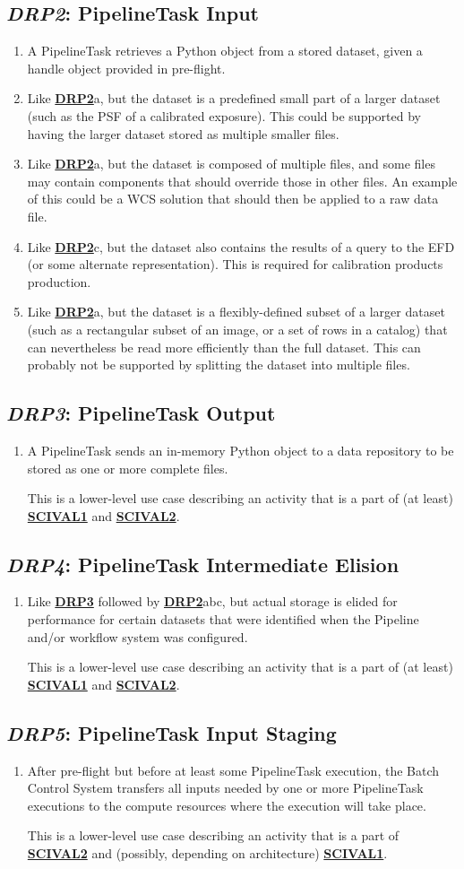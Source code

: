 \documentclass[DM,toc,lsstdraft]{lsstdoc}
\newcommand{\usecase}[3]{%
\subsection{\emph{#1}: #2}
\label{use:#1}
\begin{enumerate}[label=\alph*.]
#3
\end{enumerate}
}
\newcommand{\useref}[1]{\hyperref[use:#1]{\textcolor{lsstblue}{\textbf{#1}}}}
\begin{document}
\usecase{DRP2}{PipelineTask Input}{%

\item
A PipelineTask retrieves a Python object from a stored dataset, given a handle object provided in pre-flight.

\item
Like \useref{DRP2}a, but the dataset is a predefined small part of a larger dataset (such as the PSF of a calibrated exposure).
This could be supported by having the larger dataset stored as multiple smaller files.

\item
Like \useref{DRP2}a, but the dataset is composed of multiple files, and some files may contain components that should override those in other files.
An example of this could be a WCS solution that should then be applied to a raw data file.

\item
Like \useref{DRP2}c, but the dataset also contains the results of a query to the EFD (or some alternate representation).  This is required for calibration products production.

\item
Like \useref{DRP2}a, but the dataset is a flexibly-defined subset of a larger dataset (such as a rectangular subset of an image, or a set of rows in a catalog) that can nevertheless be read more efficiently than the full dataset.
This can probably not be supported by splitting the dataset into multiple files.
}

\usecase{DRP3}{PipelineTask Output}{%

\item
A PipelineTask sends an in-memory Python object to a data repository to be stored as one or more complete files.

This is a lower-level use case describing an activity that is a part of (at least) \useref{SCIVAL1} and \useref{SCIVAL2}.
}

\usecase{DRP4}{PipelineTask Intermediate Elision}{%

\item
Like \useref{DRP3} followed by \useref{DRP2}abc, but actual storage is elided for performance for certain datasets that were identified when the Pipeline and/or workflow system was configured.

This is a lower-level use case describing an activity that is a part of (at least) \useref{SCIVAL1} and \useref{SCIVAL2}.
}

\usecase{DRP5}{PipelineTask Input Staging}{%

\item
After pre-flight but before at least some PipelineTask execution, the Batch Control System transfers all inputs needed by one or more PipelineTask executions to the compute resources where the execution will take place.

This is a lower-level use case describing an activity that is a part of \useref{SCIVAL2} and (possibly, depending on architecture) \useref{SCIVAL1}.
}
\end{document}
